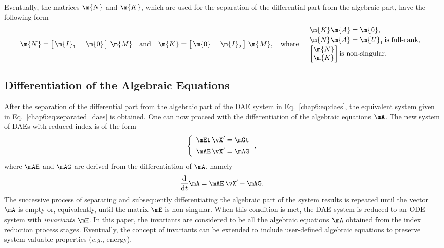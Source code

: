 %
Eventually, the matrices $\m{N}$ and $\m{K}$, which are used for the separation of the differential part from the algebraic part, have the following form
%
\begin{equation}
    \m{N} = \begin{bmatrix} \,\m{I}_1\, & \,\m{0}\, \end{bmatrix} \, \m{M}
    \quad \text{and} \quad
    \m{K} = \begin{bmatrix} \,\m{0}\, & \,\m{I}_2\, \end{bmatrix} \, \m{M},
    \quad \text{where} \quad
    \begin{array}{l}
        \m{K}\m{A} = \m{0} \text{,} \\[0.5mm]
        \m{N}\m{A} = \m{U}_1 \, \text{is full-rank,} \\[0.5mm]
        \begin{bmatrix} \m{N} \\ \m{K} \end{bmatrix} \text{is non-singular.}
    \end{array}
\end{equation}

\subsection{Differentiation of the Algebraic Equations}

After the separation of the differential part from the algebraic part of the \ac{DAE} system in Eq.~\eqref{chap6:eq:daes}, the equivalent system given in Eq.~\eqref{chap6:eq:separated_daes} is obtained. One can now proceed with the differentiation of the algebraic equations $\mA$. The new system of \acp{DAE} with reduced index is of the form
%
\begin{equation}
    \label{chap6:eq:reduced_daes}
    \left\{\begin{array}{l}
        \mEt \, \vX^\prime = \mGt \\[0.4em]
        \mAE \, \vX^\prime = \mAG
    \end{array}\right.,
\end{equation}
%
where $\mAE$ and $\mAG$ are derived from the differentiation of $\mA$, namely
%
\begin{equation}
    \dfrac{\mathrm{d}}{\mathrm{d}t} \mA = \mAE \, \vX^\prime - \mAG.
\end{equation}
%
The successive process of separating and subsequently differentiating the algebraic part of the system results is repeated until the vector $\mA$ is empty or, equivalently, until the matrix $\mE$ is non-singular. When this condition is met, the \ac{DAE} system is reduced to an \ac{ODE} system with \emph{invariants} $\mH$. In this paper, the invariants are considered to be all the algebraic equations $\mA$ obtained from the index reduction process stages. Eventually, the concept of invariants can be extended to include user-defined algebraic equations to preserve system valuable properties (\emph{e.g.}, energy).

